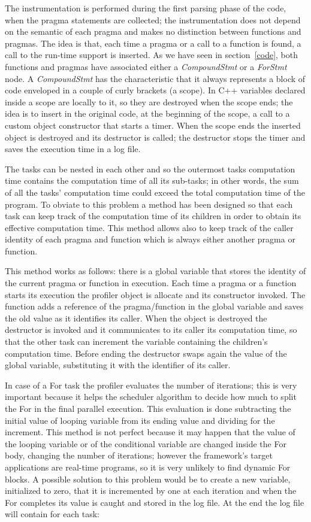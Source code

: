 \documentclass[a4paper,12pt,oneside]{book}
\begin{document}
The instrumentation is performed during the first parsing phase of the code, when the pragma statements are collected; the instrumentation does not depend on the semantic of each pragma and makes no distinction between functions and pragmas. The idea is that, each time a pragma or a call to a function is found, a call to the run-time support is inserted. As we have seen in section~\ref{code}, both functions and pragmas have associated either a \emph{CompoundStmt} or a \emph{ForStmt} node. A \emph{CompoundStmt} has the characteristic that it always represents a block of code enveloped in a couple of curly brackets (a scope). In C++ variables declared inside a scope are locally to it, so they are destroyed when the scope ends; the idea is to insert in the original code, at the beginning of the scope, a call to a custom object constructor that starts a timer. When the scope ends the inserted object is destroyed and its destructor is called; the destructor stops the timer and saves the execution time in a log file. 

The tasks can be nested in each other and so the outermost tasks computation time contains the computation time of all its sub-tasks; in other words, the sum of all the tasks’ computation time could exceed the total computation time of the program. To obviate to this problem a method has been designed so that each task can keep track of the computation time of its children in order to obtain its effective computation time. This method allows also to keep track of the caller identity of each pragma and function which is always either another pragma or function.

This method works as follows: there is a global variable that stores the identity of the current pragma or function in execution. Each time a pragma or a function starts its execution the profiler object is allocate and its constructor invoked. The function adds a reference of the pragma/function in the global variable and saves the old value as it identifies its caller. When the object is destroyed the destructor is invoked and it communicates to its caller its computation time, so that the other task can increment the variable containing the children's computation time. Before ending the destructor swaps again the value of the global variable, substituting it with the identifier of its caller. 

In case of a For task the profiler evaluates the number of iterations; this is very important because it helps the scheduler algorithm to decide how much to split the For in the final parallel execution. This evaluation is done subtracting the initial value of looping variable from its ending value and dividing for the increment. This method is not perfect because it may happen that the value of the looping variable or of the conditional variable are changed inside the For body, changing the number of iterations; however the framework’s target applications are real-time programs, so it is very unlikely to find dynamic For blocks. A possible solution to this problem would be to create a new variable, initialized to zero, that it is incremented by one at each iteration and when the For completes its value is caught and stored in the log file. At the end the log file will contain for each task:
\end{document}
